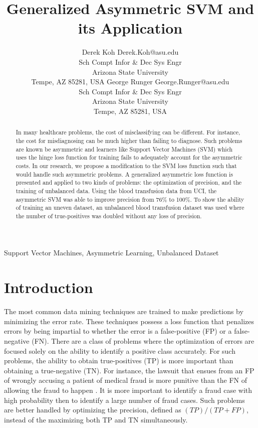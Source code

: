 \documentclass[twoside,11pt]{article}
\title{Generalized Asymmetric SVM and its Application}
\author{\name Derek Koh \email Derek.Koh@asu.edu \\
       \addr Sch Compt Infor \& Dec Sys Engr\\
       Arizona State University\\
       Tempe, AZ 85281, USA
       \AND
\name George Runger \email George.Runger@asu.edu\\
       \addr Sch Compt Infor \& Dec Sys Engr\\
       Arizona State University\\
       Tempe, AZ 85281, USA
}
\begin{document}
\maketitle
\begin{abstract}\label{Abstract}
In many healthcare problems, the cost of misclassifying can be different. For instance, the cost for misdiagnosing can be much higher than failing to diagnose. Such problems are known be asymmetric and learners like Support Vector Machines (SVM) which uses the hinge loss function for training fails to adequately account for the asymmetric costs. In our research, we propose a modification to the SVM loss function such that would handle such asymmetric problems. A generalized asymmetric loss function is presented and applied to two kinds of problems: the optimization of precision, and the training of unbalanced data. Using the blood transfusion data from UCI, the asymmetric SVM was able to improve precision from 76\% to 100\%. To show the ability of training an uneven dataset, an unbalanced blood transfusion dataset was used where the number of true-positives was doubled without any loss of precision.
\end{abstract}

\begin{keywords}
  Support Vector Machines, Asymmetric Learning, Unbalanced Dataset
\end{keywords}

\section{Introduction}\label{Introduction}

The most common data mining techniques are trained to make predictions by minimizing the error rate. These techniques possess a loss function that penalizes errors by being impartial to whether the error is a false-positive (FP) or a false-negative (FN). There are a class of problems where the optimization of errors are focused solely on the ability to identify a positive class accurately. For such problems, the ability to obtain true-positives (TP) is more important than obtaining a true-negative (TN). For instance, the lawsuit that ensues from an FP of wrongly accusing a patient of medical fraud is more punitive than the FN of allowing the fraud to happen \citep{Liou08}. It is more important to identify a fraud case with high probability then to identify a large number of fraud cases. Such problems are better handled by optimizing the precision, defined as $(TP)/(TP+FP)$, instead of the maximizing both TP and TN simultaneously.
\end{document}

